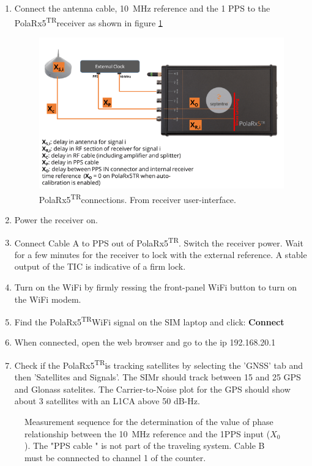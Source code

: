 \documentclass[11pt]{article}
\newcommand{\polar}[0]{PolaRx5\textsuperscript{TR}}
\begin{document}
\begin{enumerate}
    \item Connect the antenna cable, \SI{10}{\mega\hertz} reference and the 1 PPS to the \polar receiver as shown in figure \ref{fig:cggttsdelays.png}
    
    \begin{figure}[ht]
    \begin{center}
    \includegraphics[width=0.8\linewidth]{./Figures/cggttsdelays.png}
    \caption{\polar connections. From receiver user-interface. } \label{fig:cggttsdelays.png}
    \end{center}
    \end{figure}

    
    \item Power the receiver on.
    \item Connect Cable A to PPS out of \polar. Switch the receiver power. Wait for a few minutes for the receiver to lock with the external reference. A stable output of the TIC is indicative of a firm lock.
    \item Turn on the WiFi by firmly ressing the front-panel WiFi button to turn on the WiFi modem.
    \item Find the \polar WiFi signal on the SIM laptop and click: \textbf{Connect}
    \item When connected, open the web browser and go to the ip 192.168.20.1
    \item Check if the \polar is tracking satellites by selecting the 'GNSS' tab and then 'Satellites and Signals'. The SIMr should track between 15 and 25 GPS and Glonass satelites. The Carrier-to-Noise plot for the GPS should show about 3 satellites with an L1CA above 50 dB-Hz.
\end{enumerate}

\begin{figure}[ht]
\begin{center}

\caption{Measurement sequence for the determination of the value of phase relationship between the \SI{10}{\mega\hertz} reference and the 1PPS input ($X_0$). The "PPS cable " is not part of the traveling system. Cable B must be connnected to channel 1 of the counter.} \label{fig:cabledelaymeasurement}
\end{center}
\end{figure}
\end{document}
